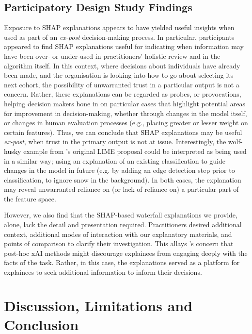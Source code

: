 \subsection{Participatory Design Study Findings}\label{ssec:cs_discussion}
Exposure to SHAP explanations appears to have yielded useful insights when used as part of an \emph{ex-post} decision-making process. In particular, participants appeared to find SHAP explanations useful for indicating when information may have been over- or under-used in practitioners' holistic review and in the algorithm itself. In this context, where decisions about individuals have already been made, and the organisation is looking into how to go about selecting its next cohort, the possibility of unwarranted trust in a particular output is not a concern. Rather, these explanations can be regarded as probes, or provocations, helping decision makers hone in on particular cases that highlight potential areas for improvement in decision-making, whether through changes in the model itself, or changes in human evaluation processes (e.g., placing greater or lesser weight on certain features). Thus, we can conclude that SHAP explanations may be useful \emph{ex-post}, when trust in the primary output is not at issue. Interestingly, the wolf-husky example from \textcite{Ribeiro-et-al-lime}'s original LIME proposal could be interpreted as being used in a similar way; using an explanation of an existing classification to guide changes in the model in future (e.g. by adding an edge detection step prior to classification, to ignore snow in the background). In both cases, the explanation may reveal unwarranted reliance on (or lack of reliance on) a particular part of the feature space.

However, we also find that the SHAP-based waterfall explanations we provide, alone, lack the detail and presentation required. Practitioners desired additional context, additional modes of interaction with our explanatory materials, and points of comparison to clarify their investigation. This allays \textcite{Miller_2023}'s concern that post-hoc xAI methods might discourage explainees from engaging deeply with the facts of the task. Rather, in this case, the explanations served as a platform for explainees to seek additional information to inform their decisions.

\section{Discussion, Limitations and Conclusion}
